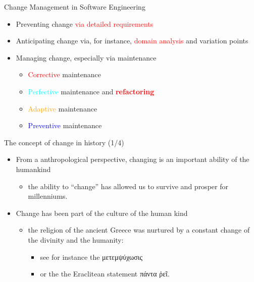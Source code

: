 \documentclass{beamer}
\begin{document}
\begin{frame}
{\centerline{Change Management in Software Engineering}}
 
\begin{itemize}
\item Preventing change \textcolor{red}{via detailed requirements}
\item Anticipating change via, for instance, \textcolor{red}{domain analysis} and variation points
\item Managing change, especially via maintenance
\begin{itemize}
\item \textcolor{red}{Corrective} maintenance
\item \textcolor{cyan}{Perfective} maintenance and \textcolor{red}{\textbf{refactoring}}
\item \textcolor{orange}{Adaptive} maintenance
\item \textcolor{blue}{Preventive} maintenance
\end{itemize} 
\end{itemize} 

\end{frame}




\begin{frame}
{\centerline{The concept of change in history (1/4)}}
 
\begin{itemize}
 \item From a anthropological perspective, changing is an important ability of the humankind
\begin{itemize}
\item  the ability to ``change'' has allowed us to survive and prosper for millenniums.
\end{itemize} 
\item Change has been part of the culture of the human kind
\begin{itemize}
\item the religion of the ancient Greece was nurtured by a constant change of the divinity and the humanity:
\begin{itemize}
\item see for instance the \foreignlanguage{greek}{μετεμψύχωσις} 
\item or the the Eraclitean statement \foreignlanguage{greek}{πάντα ῥεῖ}.
\end{itemize} 

\end{itemize} 

\end{itemize} 

\end{frame}
\end{document}
